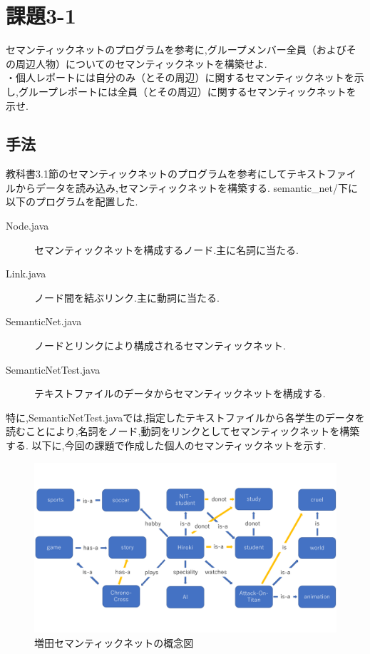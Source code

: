 \documentclass[uplatex,12pt]{jsarticle}
\begin{document}
\section{課題3-1}
\begin{screen}
    セマンティックネットのプログラムを参考に,グループメンバー全員（およびその周辺人物）についてのセマンティックネットを構築せよ.\\
    ・個人レポートには自分のみ（とその周辺）に関するセマンティックネットを示し,グループレポートには全員（とその周辺）に関するセマンティックネットを示せ.
\end{screen}

\subsection{手法}
教科書3.1節のセマンティックネットのプログラムを参考にしてテキストファイルからデータを読み込み,セマンティックネットを構築する.
semantic\_net/下に以下のプログラムを配置した.
\begin{description}
    \item[Node.java] セマンティックネットを構成するノード.主に名詞に当たる.
    \item[Link.java] ノード間を結ぶリンク.主に動詞に当たる.
    \item[SemanticNet.java] ノードとリンクにより構成されるセマンティックネット.
    \item[SemanticNetTest.java] テキストファイルのデータからセマンティックネットを構成する.
\end{description}
特に,SemanticNetTest.javaでは,指定したテキストファイルから各学生のデータを読むことにより,名詞をノード,動詞をリンクとしてセマンティックネットを構築する.
以下に,今回の課題で作成した個人のセマンティックネットを示す.
\begin{figure}[!hbt]
    \centering
    \includegraphics[scale=0.40]{images/masuda_semantic_net.pdf}
    \caption{増田セマンティックネットの概念図}
\end{figure}
\end{document}
